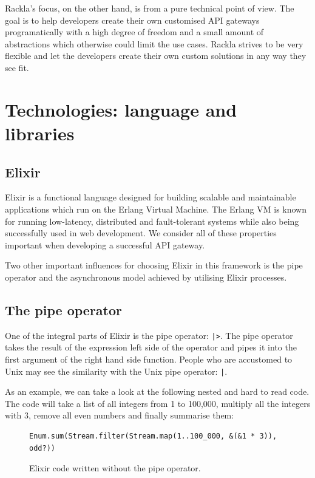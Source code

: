 \documentclass{cslthse-msc}
\begin{document}
Rackla's focus, on the other hand, is from a pure technical point of view. The goal is to help developers create their own customised API gateways programatically with a high degree of freedom and a small amount of abstractions which otherwise could limit the use cases. Rackla strives to be very flexible and let the developers create their own custom solutions in any way they see fit.

\section{Technologies: language and libraries}
\subsection{Elixir}
Elixir is a functional language designed for building scalable and maintainable applications which run on the Erlang Virtual Machine. The Erlang VM is known for running low-latency, distributed and fault-tolerant systems while also being successfully used in web development\cite{elixir}. We consider all of these properties important when developing a successful API gateway.

Two other important influences for choosing Elixir in this framework is the pipe operator and the asynchronous model achieved by utilising Elixir processes.

\subsection{The pipe operator}
One of the integral parts of Elixir is the pipe operator: \lstinline{|>}. The pipe operator takes the result of the expression left side of the operator and pipes it into the first argument of the right hand side function. People who are accustomed to Unix may see the similarity with the Unix pipe operator: \lstinline{|}.

\vspace{5mm}

\noindent As an example, we can take a look at the following nested and hard to read code. The code will take a list of all integers from 1 to 100,000, multiply all the integers with 3, remove all even numbers and finally summarise them:

\begin{figure}[H]
  \centering
\begin{lstlisting}[breaklines=true,frame=single]
Enum.sum(Stream.filter(Stream.map(1..100_000, &(&1 * 3)), odd?))
\end{lstlisting}
  \caption{Elixir code written without the pipe operator.}
  \label{fig:no_pipe}
\end{figure}
\end{document}
